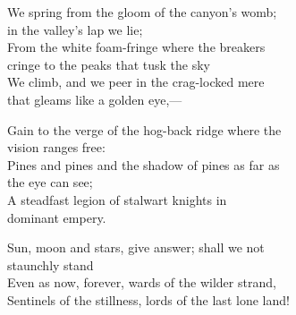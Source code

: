 \begin{poemblock}
We spring from the gloom of the canyon's womb;\\
\idt in the valley's lap we lie;\\
From the white foam-fringe where the breakers\\
\idt cringe to the peaks that tusk the sky\\
We climb, and we peer in the crag-locked mere\\
\idt that gleams like a golden eye,—

Gain to the verge of the hog-back ridge where the\\
\idt vision ranges free:\\
Pines and pines and the shadow of pines as far as\\
\idt the eye can see;\\
A steadfast legion of stalwart knights in\\
\idt dominant empery.

Sun, moon and stars, give answer; shall we not\\
\idt staunchly stand\\
Even as now, forever, wards of the wilder strand,\\
Sentinels of the stillness, lords of the last lone land!
\end{poemblock}

